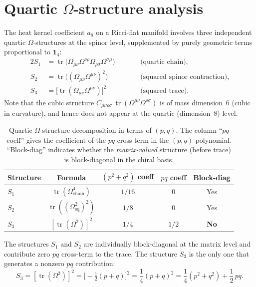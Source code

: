 \documentclass[12pt,a4paper]{article}
\theoremstyle{definition}
\theoremstyle{remark}
\newcommand{\tr}{\operatorname{tr}}
\newcommand{\half}{\tfrac{1}{2}}
\begin{document}
\section{Quartic \texorpdfstring{$\Omega$}{Omega}-structure analysis}
\label{sec:quartic}

The heat kernel coefficient $a_8$ on a Ricci-flat manifold involves three
independent quartic $\Omega$-structures at the spinor level, supplemented
by purely geometric terms proportional to $\mathbf{1}_4$:
\begin{alignat}{2}
  S_1 &= \tr\!\bigl(\Omega_{\mu\nu}\Omega^{\nu\rho}\Omega_{\rho\sigma}
  \Omega^{\sigma\mu}\bigr) &\qquad &\text{(quartic chain)},
  \label{eq:S1} \\
  S_2 &= \tr\!\bigl((\Omega_{\mu\nu}\Omega^{\mu\nu})^2\bigr) &\qquad
  &\text{(squared spinor contraction)},
  \label{eq:S2} \\
  S_3 &= \bigl[\tr(\Omega_{\mu\nu}\Omega^{\mu\nu})\bigr]^2 &\qquad
  &\text{(squared trace)}.
  \label{eq:S3}
\end{alignat}
Note that the cubic structure
$C_{\mu\nu\rho\sigma}\,\tr(\Omega^{\mu\nu}\Omega^{\rho\sigma})$
is of mass dimension~6 (cubic in curvature), and hence does not appear
at the quartic (dimension~8) level.

\begin{table}[ht]
\centering
\caption{Quartic $\Omega$-structure decomposition in terms of $(p, q)$.
The column ``$pq$ coeff'' gives the coefficient of the $pq$ cross-term
in the $(p,q)$ polynomial.  ``Block-diag'' indicates whether the
\emph{matrix-valued} structure (before trace) is block-diagonal in the
chiral basis.}
\label{tab:omega}
\begin{tabular}{lcccc}
\toprule
Structure & Formula & $(p^2{+}q^2)$ coeff & $pq$ coeff & Block-diag \\
\midrule
$S_1$ & $\tr(\Omega^4_{\mathrm{chain}})$ & $1/16$ & $0$ & Yes \\
$S_2$ & $\tr((\Omega^2_{\mathrm{sq}})^2)$ & $1/8$ & $0$ & Yes \\
$S_3$ & $[\tr(\Omega^2)]^2$ & $1/4$ & $1/2$ & \textbf{No} \\
\bottomrule
\end{tabular}
\end{table}

The structures $S_1$ and $S_2$ are individually block-diagonal at
the matrix level and contribute zero $pq$ cross-term to the trace.  The
structure $S_3$ is the only one that generates a nonzero $pq$ contribution:
\begin{equation}\label{eq:S3-expand}
  S_3 = [\tr(\Omega^2)]^2
  = \bigl[-\half(p+q)\bigr]^2
  = \frac{1}{4}(p+q)^2
  = \frac{1}{4}(p^2 + q^2) + \frac{1}{2}\,pq.
\end{equation}
\end{document}
